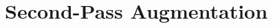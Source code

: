 \documentclass[11pt,a4paper]{article}
\begin{document}
%			




\section{Second-Pass Augmentation}
\end{document}

